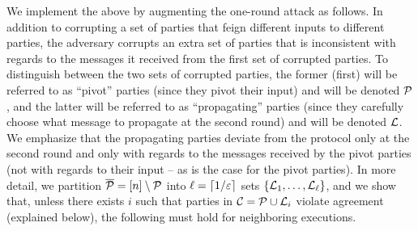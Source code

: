 We implement the above by augmenting the one-round attack as follows. In addition to corrupting a set of parties that feign different inputs to different parties, the adversary corrupts an extra set of parties that is inconsistent with regards to the messages it received from the first set of corrupted parties. To distinguish between the two sets of corrupted parties, the former (first) will be referred to as ``pivot'' parties (since they pivot their input) and will be denoted $\mathcal{P}$, and the latter will be referred to as ``propagating'' parties (since they carefully choose what message to propagate at the second round) and will be denoted ${\cal{L}}$. We emphasize that the propagating parties deviate from the protocol only at the second round and only with regards to the messages received by the pivot parties (not with regards to their input -- as is the case for the pivot parties). In more detail, we partition ${\overline{\mathcal{P}}} = [n]\setminus \mathcal{P}$ into $\ell=\lceil 1/\varepsilon\rceil$ sets $\{{\cal{L}}_1,\ldots,{\cal{L}}_\ell\}$, and we show that, unless there exists $i$ such that parties in $\mathcal{C}= \mathcal{P}\cup {\cal{L}}_i$ violate agreement (explained below), the following must hold for neighboring executions.

